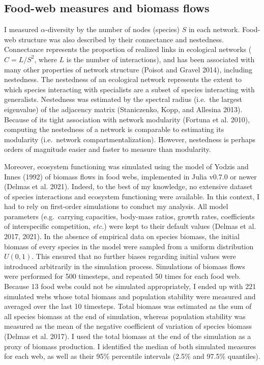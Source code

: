 \documentclass[11pt]{article}
\begin{document}
\hypertarget{food-web-measures-and-biomass-flows}{%
\subsection{Food-web measures and biomass
flows}\label{food-web-measures-and-biomass-flows}}

I measured \(\alpha\)-diversity by the number of nodes (species) \(S\)
in each network. Food-web structure was also described by their
connectance and nestedness. Connectance represents the proportion of
realized links in ecological networks (\(C=L/S^2\), where \(L\) is the
number of interactions), and has been associated with many other
properties of network structure (Poisot and Gravel 2014), including
nestedness. The nestedness of an ecological network represents the
extent to which species interacting with specialists are a subset of
species interacting with generalists. Nestedness was estimated by the
spectral radius (i.e.~the largest eigenvalue) of the adjacency matrix
(Staniczenko, Kopp, and Allesina 2013). Because of its tight association
with network modularity (Fortuna et al. 2010), computing the nestedness
of a network is comparable to estimating its modularity (i.e.~network
compartmentalization). However, nestedness is perhaps orders of
magnitude easier and faster to measure than modularity.

Moreover, ecosystem functioning was simulated using the model of Yodzis
and Innes (1992) of biomass flows in food webs, implemented in Julia
v0.7.0 or newer (Delmas et al. 2021). Indeed, to the best of my
knowledge, no extensive dataset of species interactions and ecosystem
functioning were available. In this context, I had to rely on
first-order simulations to conduct my analysis. All model parameters
(e.g.~carrying capacities, body-mass ratios, growth rates, coefficients
of interspecific competition, \emph{etc.}) were kept to their default
values (Delmas et al. 2017, 2021). In the absence of empirical data on
species biomass, the initial biomass of every species in the model were
sampled from a uniform distribution \(U(0,1)\). This ensured that no
further biases regarding initial values were introduced arbitrarily in
the simulation process. Simulations of biomass flows were performed for
500 timesteps, and repeated 50 times for each food web. Because 13 food
webs could not be simulated appropriately, I ended up with 221 simulated
webs whose total biomass and population stability were measured and
averaged over the last 10 timesteps. Total biomass was estimated as the
sum of all species biomass at the end of simulation, whereas population
stability was measured as the mean of the negative coefficient of
variation of species biomass (Delmas et al. 2017). I used the total
biomass at the end of the simulation as a proxy of biomass production. I
identified the median of both simulated measures for each web, as well
as their 95\% percentile intervals (2.5\% and 97.5\% quantiles).
\end{document}

